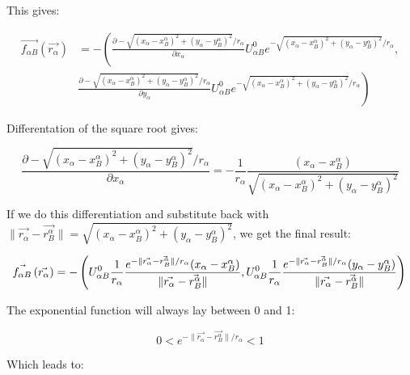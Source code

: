 This gives:

\begin{equation}
\begin{split}
    \vec{f_{\alpha B}} \left( \vec{r_{\alpha}} \right) 
 & =-\left( \frac{\partial -\sqrt{(x_{\alpha}-x^{\alpha}_{B})^2+(y_{\alpha}-y^{\alpha}_B)^2} / r_{\alpha}}{\partial  x_{\alpha}}U^0_{\alpha B} e^{-\sqrt{(x_{\alpha}-x^{\alpha}_{B})^2+(y_{\alpha}-y^{\alpha}_B)^2} / r_{\alpha} } \right. , \\
& \left. \frac{\partial -\sqrt{(x_{\alpha}-x^{\alpha}_{B})^2+(y_{\alpha}-y^{\alpha}_B)^2} / r_{\alpha}}{\partial y_{\alpha}}U^0_{\alpha B} e^{- \sqrt{(x_{\alpha}-x^{\alpha}_{B})^2+(y_{\alpha}-y^{\alpha}_B)^2} / r_{\alpha} } \right)
\end{split}
\end{equation}

Differentation of the square root gives:

\begin{equation}
 \frac{\partial -\sqrt{(x_{\alpha}-x^{\alpha}_{B})^2+(y_{\alpha}-y^{\alpha}_B)^2} / r_{\alpha}}{\partial x_{\alpha}} =-\frac{1}{r_{\alpha}}\frac{(x_{\alpha}-x_{B}^{\alpha})}{\sqrt{(x_{\alpha}-x^{\alpha}_{B})^2+(y_{\alpha}-y^{\alpha}_B)^2} }
\end{equation}

If we do this differentiation and substitute back with
$\| \vec{r_{\alpha}} - \vec{r_{B}^{\alpha}} \|= \sqrt{(x_{\alpha}-x^{\alpha}_{B})^2+(y_{\alpha}-y^{\alpha}_B)^2}$, 
we get the final result:

\begin{equation}
    \vec{f_{\alpha B}} \left( \vec{r_{\alpha}} \right) 
=-\left(U^0_{\alpha B}\frac{1}{r_{\alpha}}\frac{e^{- \| \vec{r_{\alpha}} - \vec{r_{B}^{\alpha}} \| / r_{\alpha} } (x_{\alpha}-x_B^{\alpha})}{\| \vec{r_{\alpha}} - \vec{r_{B}^{\alpha}} \| },U^0_{\alpha B}\frac{1}{r_{\alpha}}\frac{e^{- \| \vec{r_{\alpha}} - \vec{r_{B}^{\alpha}} \| / r_{\alpha} } (y_{\alpha}-y_B^{\alpha})}{\| \vec{r_{\alpha}} - \vec{r_{B}^{\alpha}} \| }\right) \\
\end{equation}

The exponential function will always lay between 0 and 1:

\begin{equation}
0 < e^{ -\| \vec{r_{\alpha}} - \vec{r_{B}^{\alpha}} \| /r_\alpha} < 1
\end{equation}

Which leads to:


